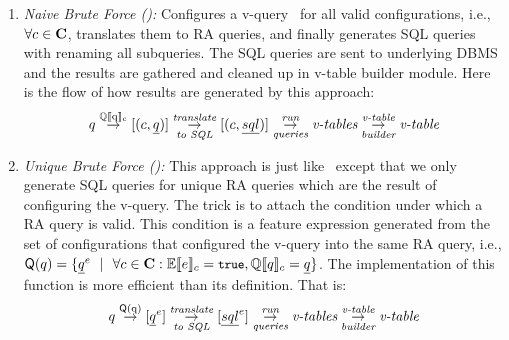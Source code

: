 \begin{enumerate}
\item
\emph{Naive Brute Force (\nbf):}
Configures a v-query \vQ\ for all valid configurations, i.e., 
\ensuremath{\forall \config \in \confSet}, translates them to RA queries,
and finally generates SQL queries with renaming all subqueries. The 
SQL queries are sent to underlying DBMS and the results are gathered and
cleaned up in v-table builder module. Here is the flow of how results are generated by 
this approach:
%
\[\vQ \mathrel{\mathop{\rightarrow}^{\mathrm{\eeSem \vQ}}} [ ( \config, \pQ ) ] 
\mathrel{\mathop{\rightarrow}^{\mathrm{\textit{translate}}}_{\mathrm{\textit{to SQL}}}} [ ( \config, \sqlQ ) ]
\mathrel{\mathop{\rightarrow}^{\mathrm{\textit{run}}}_{\mathrm{\textit{queries}}}} \textit{v-tables}
\mathrel{\mathop{\rightarrow}^{\mathrm{\textit{v-table}}}_{\mathrm{\textit{builder}}}} \textit{v-table}
\]

\item
\emph{Unique Brute Force (\ubf):}
This approach is just like \nbf\ except that we only generate SQL 
queries for unique RA queries which are the result of configuring the v-query.
The trick is to attach the condition under which a 
RA query is valid. This condition is a feature expression generated from
the set of configurations that configured the v-query into the same RA query, i.e.,
\ensuremath{
\qGroup \vQ = \setDef {\annot \pQ \myOR \forall \config \in \confSet: \fSem \dimMeta = \t,
\eeSem \vQ = \pQ}
}. The implementation of this function is more efficient than its definition.
That is:
%
\[\vQ \mathrel{\mathop{\rightarrow}^{\mathrm{\qGroup \vQ}}} [ \annot [\dimMeta] {\pQ} ] 
\mathrel{\mathop{\rightarrow}^{\mathrm{\textit{translate}}}_{\mathrm{\textit{to SQL}}}} [ \annot [\dimMeta] {\sqlQ} ]
\mathrel{\mathop{\rightarrow}^{\mathrm{\textit{run}}}_{\mathrm{\textit{queries}}}} \textit{v-tables}
\mathrel{\mathop{\rightarrow}^{\mathrm{\textit{v-table}}}_{\mathrm{\textit{builder}}}} \textit{v-table}
\]


\end{enumerate}
